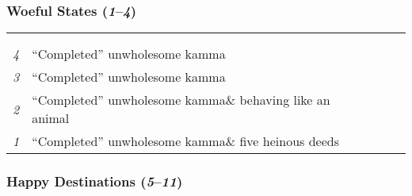 \documentclass[a4 paper, 12pt]{article}
\begin{document}
\subsubsection*{Woeful States (\textit{1}--\textit{4})}
\noindent\begin{tabular}{L{0.05\textwidth} C{0.36\textwidth} C{0.15\textwidth} C{0.2\textwidth} C{0.12\textwidth} C{0.12\textwidth}}
\toprule
 & 
 & 
 & 
 & 
 \\
 & & & &  & 
 \\
\midrule
\textit{4}
& ``Completed'' unwholesome kamma
& 
& 
& 
& 
\\[9mm]
\textit{3} & ``Completed'' unwholesome kamma & & & &
\\[9mm]
\textit{2} & ``Completed'' unwholesome kamma\newline \& behaving like an animal & & & &
\\[9mm]
\textit{1} & ``Completed'' unwholesome kamma\newline \& five heinous deeds & & & &
\\[9mm]
\bottomrule
\end{tabular}

\vspace{10mm}

\subsubsection*{Happy Destinations (\textit{5}--\textit{11})}
\end{document}
